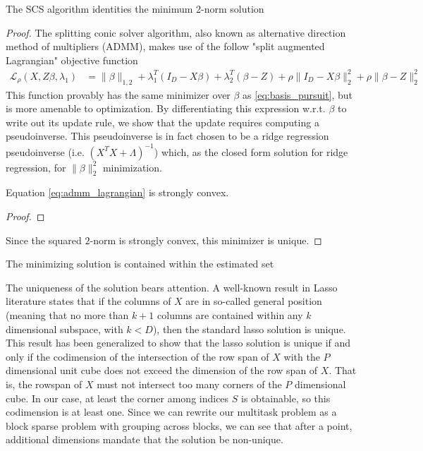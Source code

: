 \begin{proposition}
The SCS algorithm identities the minimum 2-norm solution
\end{proposition}
\begin{proof}
The splitting conic solver algorithm, also known as alternative direction method of multipliers (ADMM), makes use of the follow "split augmented Lagrangian" objective function
\begin{align}
\label{eq:admm_lagrangian}
\mathcal L_\rho (X, Z \beta, \lambda_1) &= \|\beta\|_{1,2} + \lambda_1^T (I_D - X \beta) + \lambda_2^T (\beta - Z)  +  \rho \| I_D - X \beta\|_2^2 + \rho \|\beta - Z\|_2^2
\end{align}
This function provably has the same minimizer over $\beta$ as \ref{eq:basis_pursuit}, but is more amenable to optimization.
By differentiating this expression w.r.t. $\beta$ to write out its update rule, we show that the update requires computing a pseudoinverse.
This pseudoinverse is in fact chosen to be a ridge regression pseudoinverse (i.e. $(X^T X + \Lambda)^{-1} $) which, as the closed form solution for ridge regression, for $\|\beta\|_2^2$ minimization.



\begin{proposition}
Equation \ref{eq:admm_lagrangian} is strongly convex.
\end{proposition}
\begin{proof}
\end{proof}

Since the squared $2$-norm is strongly convex, this minimizer is unique.
\end{proof}

\begin{proposition}
The minimizing solution is contained within the estimated set
\end{proposition}

The uniqueness of the solution bears attention.
A well-known result in Lasso literature states that if the columns of $X$ are in so-called general position (meaning that no more than $k+1$ columns are contained within any $k$ dimensional subspace, with $k < D$), then the standard lasso solution is unique.
This result has been generalized to show that the lasso solution is unique if and only if the codimension of the intersection of the row span of $X$ with the $P$ dimensional unit cube does not exceed the dimension of the row span of $X$.
That is, the rowspan of $X$ must not intersect too many corners of the $P$ dimensional cube.
In our case, at least the corner among indices $S$ is obtainable, so this codimension is at least one.
Since we can rewrite our multitask problem as a block sparse problem with grouping across blocks, we can see that after a point, additional dimensions mandate that the solution be non-unique.

